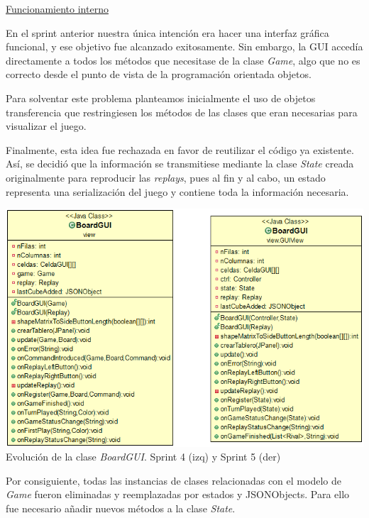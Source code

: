 \documentclass[../DocumentoOficial.tex]{subfiles}
\begin{document}
\begin{sprint}[5]
\underline{Funcionamiento interno}

En el sprint anterior nuestra única intención era hacer una interfaz gráfica funcional, y ese objetivo fue alcanzado exitosamente. Sin embargo, la GUI accedía directamente a todos los métodos que necesitase de la clase \textit{Game}, algo que no es correcto desde el punto de vista de la programación orientada objetos.

Para solventar este problema planteamos inicialmente el uso de objetos transferencia que restringiesen los métodos de las clases que eran necesarias para visualizar el juego.

Finalmente, esta idea fue rechazada en favor de reutilizar el código ya existente. Así, se decidió que la información se transmitiese mediante la clase \textit{State} creada originalmente para reproducir las \textit{replays}, pues al fin y al cabo, un estado representa una serialización del juego y contiene toda la información necesaria.

\begin{center}
\includegraphics[scale=0.47]{board-gui-evol.png}\\
\footnotesize{Evolución de la clase \textit{BoardGUI}. Sprint 4 (izq) y Sprint 5 (der)}
\end{center}

Por consiguiente, todas las instancias de clases relacionadas con el modelo de \textit{Game} fueron eliminadas y reemplazadas por estados y JSONObjects. Para ello fue necesario añadir nuevos métodos a la clase \textit{State}.


\end{sprint}
\end{document}
